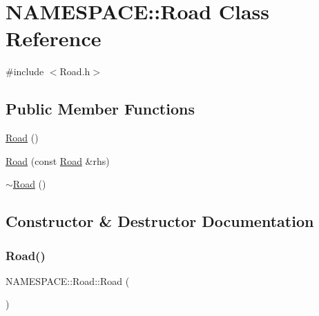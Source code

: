 \hypertarget{class_n_a_m_e_s_p_a_c_e_1_1_road}{}\section{N\+A\+M\+E\+S\+P\+A\+CE\+:\+:Road Class Reference}
\label{class_n_a_m_e_s_p_a_c_e_1_1_road}


{\ttfamily \#include $<$Road.\+h$>$}

\subsection*{Public Member Functions}
\begin{DoxyCompactItemize}
\item 
\hyperlink{class_n_a_m_e_s_p_a_c_e_1_1_road_a98587c6f1f0ebc87b2dcab04c56a2cc7}{Road} ()
\item 
\hyperlink{class_n_a_m_e_s_p_a_c_e_1_1_road_af742f9e752a32eb16a62519b951bf1ae}{Road} (const \hyperlink{class_n_a_m_e_s_p_a_c_e_1_1_road}{Road} \&rhs)
\item 
\hyperlink{class_n_a_m_e_s_p_a_c_e_1_1_road_ab0c065a99eaa852463428b1744becffc}{$\sim$\+Road} ()
\end{DoxyCompactItemize}


\subsection{Constructor \& Destructor Documentation}
\mbox{\label{class_n_a_m_e_s_p_a_c_e_1_1_road_a98587c6f1f0ebc87b2dcab04c56a2cc7}} 
\subsubsection{\texorpdfstring{Road()}{Road()}\hspace{0.1cm}{\footnotesize\ttfamily [1/2]}}
{\footnotesize\ttfamily N\+A\+M\+E\+S\+P\+A\+C\+E\+::\+Road\+::\+Road (\begin{DoxyParamCaption}{ }\end{DoxyParamCaption})}

\mbox{\label{class_n_a_m_e_s_p_a_c_e_1_1_road_af742f9e752a32eb16a62519b951bf1ae}} 
